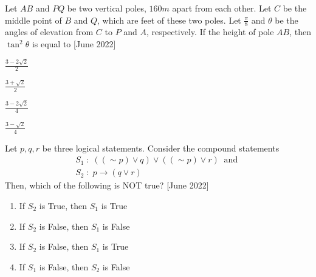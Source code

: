         \bigskip
    \item Let $AB$ and $PQ$ be two vertical poles, $160m$ apart from each other. Let $C$ be the middle point of $B$ and $Q$, which are feet of these two poles. Let $\frac{\pi}{8}$ and $\theta$ be the angles of elevation from $C$ to $P$ and $A$, respectively. If the height of pole $AB$, then $\tan^2{\theta}$ is equal to \hfill{[June 2022]}
    \begin{enumerate}
        \begin{multicols}{4}
        \item $\frac{3-2\sqrt{2}}{2}$
        \item $\frac{3+\sqrt{2}}{2}$
        \item $\frac{3-2\sqrt{2}}{4}$
        \item $\frac{3-\sqrt{2}}{4}$
        \end{multicols}
        \end{enumerate}
\bigskip
\item Let $p,q,r$ be three logical statements. Consider the compound statements
\begin{align*}
S_1 \;:\; ((\sim p) \lor q) \lor ((\sim p) \lor r) \ \text{ and } \\
S_2 \;:\; p \rightarrow (q \lor r)
\end{align*}
 Then, which of the following is NOT true? \hfill{[June 2022]}
 \begin{enumerate}
 \item If $S_2$ is True, then $S_1$ is True
 \item If $S_2$ is False, then $S_1$ is False
 \item If $S_2$ is False, then $S_1$ is True
\item If $S_1$ is False, then $S_2$ is False
 \end{enumerate}
